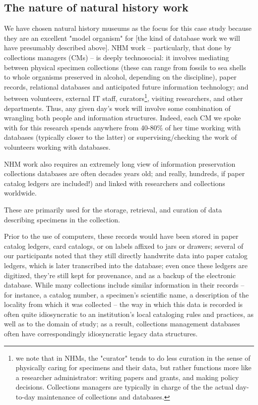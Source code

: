 \subsection{The nature of natural history work}

We have chosen natural history museums as the focus for this case study because they are an excellent "model organism" for [the kind of database work we will have presumably described above]. NHM work -- particularly, that done by collections managers (CMs) -- is deeply technosocial: it involves mediating between physical specimen collections (these can range from fossils to sea shells to whole organisms preserved in alcohol, depending on the discipline), paper records, relational databases and anticipated future information technology; and between volunteers, external IT staff, curators\footnote{we note that in NHMs, the "curator" tends to do less curation in the sense of physically caring for specimens and their data, but rather functions more like a researcher administrator: writing papers and grants, and making policy decisions. Collections managers are typically in charge of the the actual day-to-day maintenance of collections and databases.}, visiting researchers, and other departments. Thus, any given day’s work will involve some combination of wrangling both people and information structures. Indeed, each CM we spoke with for this research spends anywhere from 40-80\% of her time working with databases (typically closer to the latter) or supervising/checking the work of volunteers working with databases.

NHM work also requires an extremely long view of information preservation
 collections databases are often decades years old; and really, hundreds, if paper catalog ledgers are included!) and linked with researchers and collections worldwide.  


These are primarily used for the storage, retrieval, and curation of data describing specimens in the collection.

Prior to the use of computers, these records would have been stored in paper catalog ledgers, card catalogs, or on labels affixed to jars or drawers; several of our participants noted that they still directly handwrite data into paper catalog ledgers, which is later transcribed into the database; even once these ledgers are digitized, they’re still kept for provenance, and as a backup of the electronic database. While many collections include similar information in their records – for instance, a catalog number, a specimen’s scientific name, a description of the locality from which it was collected – the way in which this data is recorded is often quite idiosyncratic to an institution’s local cataloging rules and practices, as well as to the domain of study; as a result, collections management databases often have correspondingly idiosyncratic legacy data structures.

